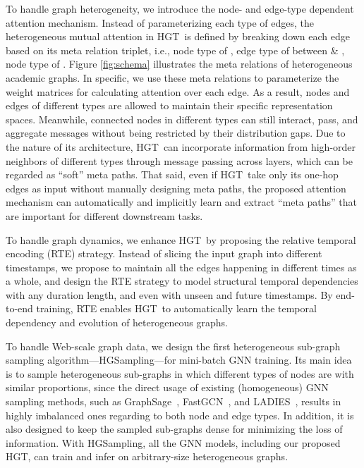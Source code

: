 \documentclass[sigconf]{acmart}
\theoremstyle{definition}
\newcommand{\short}{HGT}
\newcommand{\sampling}{HGSampling}
\begin{document}
To handle graph heterogeneity, we introduce the node- and edge-type dependent attention mechanism.
Instead of parameterizing each type of edges, the heterogeneous mutual attention in \short\ is defined by breaking down each edge  based on its meta relation triplet, i.e.,  node type of , edge type of  between  \& , node type of . Figure \ref{fig:schema} illustrates the meta relations of heterogeneous academic graphs. 
In specific, we use these meta relations to parameterize the weight matrices for calculating attention over each edge.
As a result, nodes and edges of different types are allowed to maintain their specific representation spaces.
Meanwhile, connected nodes in different types can still interact, pass, and aggregate messages without being restricted by their distribution gaps.
Due to the nature of its architecture, \short\ can incorporate information from high-order neighbors of different types through message passing across layers, which can be regarded as ``soft'' meta paths. 
That said, even if \short\ take only its one-hop edges as input without manually designing meta paths, the proposed attention mechanism can automatically and implicitly learn and extract ``meta paths'' that are important for different downstream tasks. 


To handle graph dynamics, we enhance \short\ by proposing the relative temporal encoding (RTE) strategy. 
Instead of slicing the input graph into different timestamps, we propose to maintain all the edges happening in different times as a whole, and design the RTE strategy to model structural temporal dependencies with any duration length, and even with unseen and future timestamps. 
By end-to-end training, RTE enables \short\ to automatically learn the temporal dependency and evolution of heterogeneous graphs. 


To handle Web-scale graph data, we design the first heterogeneous sub-graph sampling algorithm---\sampling---for mini-batch GNN training. 
Its main idea is to sample heterogeneous sub-graphs in which different types of nodes are with similar proportions, since the direct usage of existing (homogeneous) GNN sampling methods, such as GraphSage~\cite{graphsage}, FastGCN~\cite{fastgcn}, and LADIES~\cite{ladies}, results in highly imbalanced ones regarding to both node and edge types. 
In addition, it is also designed to keep the sampled sub-graphs dense for minimizing the loss of information. 
With \sampling, all the GNN models, including our proposed \short, can train and infer on arbitrary-size heterogeneous graphs. 
\end{document}
